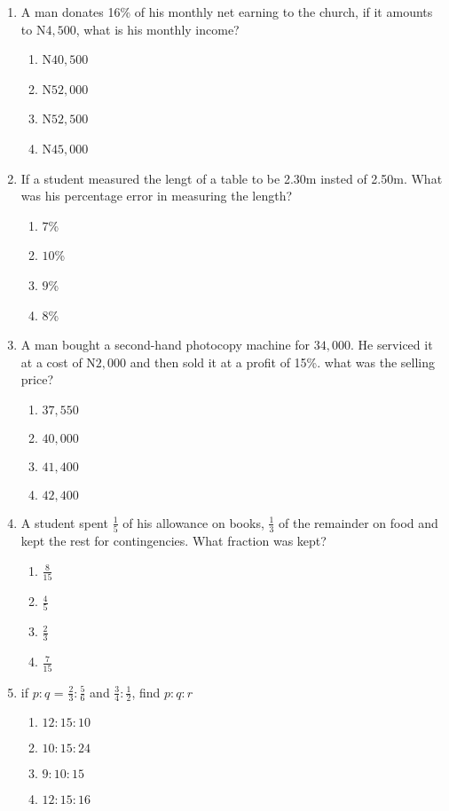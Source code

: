 \begin{multicols}{2}
\begin{enumerate}[label={\arabic*.}]
\begin{enumerate}[label={\Alph*.}]
    \end{enumerate}
\item A man donates 16\% of his monthly net earning to the church, if it amounts to N\(4,500\), 
what is his monthly income? 
    \begin{enumerate}[label={\Alph*.}]
    \item N\(40,500\)
    \item N\(52,000\)
    \item N\(52,500\)
    \item N\(45,000\)
    

    \end{enumerate}
\item If a student measured the lengt of a table to be 2.30m insted of 2.50m. 
What was his percentage error in measuring the length?
    \begin{enumerate}[label={\Alph*.}]
    \item \(7\)\%
    \item \(10\)\%
    \item \(9\)\%
    \item \(8\)\%
    

    \end{enumerate}
\item A man bought a second-hand photocopy machine for \(34,000\). He serviced 
it at a cost of N\(2,000\) and then sold it at a profit of 15\%. 
what was the selling price? 
    \begin{enumerate}[label={\Alph*.}]
    \item \(37,550\)
    \item \(40,000\)
    \item \(41,400\)
    \item \(42,400\)

    \end{enumerate}
\item A student spent \(\frac{1}{5}\) of his allowance on books, 
\(\frac{1}{3}\) of the remainder on food and kept the rest for contingencies. 
What fraction was kept?
    \begin{enumerate}[label={\Alph*.}]
    \item \(\frac{8}{15}\)
    \item \(\frac{4}{5}\)
    \item \(\frac{2}{3}\)
    \item \(\frac{7}{15}\)

    \end{enumerate}
\item if \(p:q\) = \(\frac{2}{3}:\frac{5}{6}\) and \(\frac{3}{4}:\frac{1}{2}\),
find \(p:q:r\)
    \begin{enumerate}[label={\Alph*.}]
    \item \(12:15:10\)
    \item \(10:15:24\)
    \item \(9:10:15\)
    \item \(12:15:16\)


\end{enumerate}
\end{enumerate}
\end{multicols}
